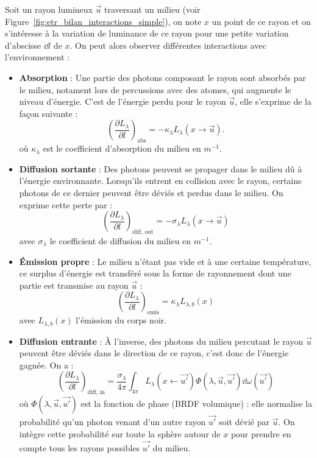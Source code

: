 Soit un rayon lumineux $ \vec{u} $ traversant un milieu (voir Figure~\ref{fig:etr_bilan_interactions_simple}), on note $x$ un point de ce rayon et on s'intéresse à la variation de luminance de ce rayon pour une petite variation d'abscisse $ \dd l$ de $x$. On peut alors observer différentes interactions avec l'environnement :
\begin{itemize}
    \item \textbf{Absorption} : Une partie des photons composant le rayon sont absorbés par le milieu, notament lors de percussions avec des atomes, qui augmente le niveau d'énergie. C'est de l'énergie perdu pour le rayon $ \vec{u} $, elle s'exprime de la façon suivante : 
    \begin{equation}
        \left( \frac{\partial L_\lambda}{ \partial l}\right)_{\text{abs}} = - \kappa_\lambda L_\lambda(x \to \vec{u} ). 
    \end{equation}
    où $ \kappa_\lambda$ est le coefficient d'absorption du milieu en $ m^{-1}$. 
    \item \textbf{Diffusion sortante} : Des photons peuvent se propager dans le milieu dû à l'énergie environnante. Lorsqu'ils entrent en collision avec le rayon, certains photons de ce dernier peuvent être déviés et perdus dans le milieu. On exprime cette perte par : 
    \begin{equation}
        \left( \frac{ \partial L_\lambda}{ \partial l}\right)_{\text{diff, out}} = - \sigma_\lambda L_\lambda(x \to \vec{u})
    \end{equation}
    avec $ \sigma_\lambda$ le coefficient de diffusion du milieu en $m^{-1}$. 
    \item \textbf{Émission propre} : Le milieu n'étant pas vide et à une certaine température, ce surplus d'énergie est transféré sous la forme de rayonnement dont une partie est transmise au rayon $ \vec{u}$ :
    \begin{equation}
         \left( \frac{ \partial L_\lambda}{ \partial l}\right)_{\text{emis}} = \kappa_\lambda L_{\lambda, b}(x)
    \end{equation}
    avec $ L_{\lambda, b}(x)$ l'émission du corps noir. 
    \item \textbf{Diffusion entrante} :  À l'inverse, des photons du milieu percutant le rayon $ \vec{u} $ peuvent être déviés dans le direction de ce rayon, c'est donc de l'énergie gagnée. On a : 
    \begin{equation}
        \left( \frac{ \partial L_\lambda}{ \partial l}\right)_{\text{diff, in}} = \frac{ \sigma_\lambda}{4 \pi} \int_{4 \pi} L_\lambda (x \leftarrow \vec{u'} ) \Phi ( \lambda, \vec{u} , \vec{u'} ) \dd \omega( \vec{u'} )
    \end{equation}
    où $ \Phi ( \lambda, \vec{u} , \vec{u'} )$ est la fonction de phase (BRDF volumique) : elle normalise la probabilité qu'un photon venant d'un autre rayon $ \vec{u'} $ soit dévié par $ \vec{u} $. On intègre cette probabilité sur toute la sphère autour de $x$ pour prendre en compte tous les rayons possibles $ \vec{u'} $ du milieu. 
\end{itemize}

